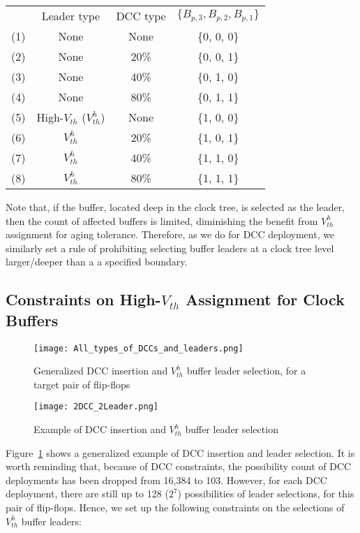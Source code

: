 {\small
\begin{tabular}{  c  c  c  c  }
  	 & Leader type & DCC type & $\{B_{p,3}, B_{p,2}, B_{p,1}\}$ \\ 
  	(1)\quad & None & None & \{0, 0, 0\} \\ 
  	(2)\quad & None &20\% &  \{0, 0, 1\} \\ 
  	(3)\quad & None &40\% &  \{0, 1, 0\} \\ 
  	(4)\quad & None &80\% &  \{0, 1, 1\} \\ 
	(5)\quad & High-$V_{th}$ ($V_{th}^h$) & None & \{1, 0, 0\} \\ 
  	(6)\quad & $V_{th}^h$ & 20\% &  \{1, 0, 1\} \\ 
  	(7)\quad & $V_{th}^h$ & 40\% &  \{1, 1, 0\} \\ 
  	(8)\quad & $V_{th}^h$ & 80\% &  \{1, 1, 1\} \\ 
\end{tabular}}

Note that, if the buffer, located deep in the clock tree, is selected as the leader, then the count of affected buffers is limited, diminishing the benefit from $V_{th}^h$ assignment for aging tolerance. Therefore, as we do for DCC deployment, we similarly set a rule of prohibiting selecting buffer leaders at a clock tree level larger/deeper than a a specified boundary.
\subsection{Constraints on High-$V_{th}$ Assignment for Clock Buffers}
\begin{figure}
	\centering
	\texttt{[image: All\_types\_of\_DCCs\_and\_leaders.png]} %
	\caption{Generalized DCC insertion and $V_{th}^h$ buffer leader selection, for a target pair of flip-flops}
	\label{fig:leadertype}
\end{figure}
\begin{figure}[t!]
    \centering
    \texttt{[image: 2DCC\_2Leader.png]} %
    \caption{Example of DCC insertion and $V_{th}^h$ buffer leader selection}
    \label{fig:2dcc2leader}
\end{figure}

Figure~\ref{fig:leadertype} shows a generalized example of DCC insertion and leader selection. It is worth reminding that, because of DCC constraints, the possibility count of DCC deployments has been dropped from 16,384 to 103. However, for each DCC deployment, there are still up to 128 ($2^7$) possibilities of leader selections, for this pair of flip-flops. Hence, we set up the following constraints on the selections of $V_{th}^h$ buffer leaders:

